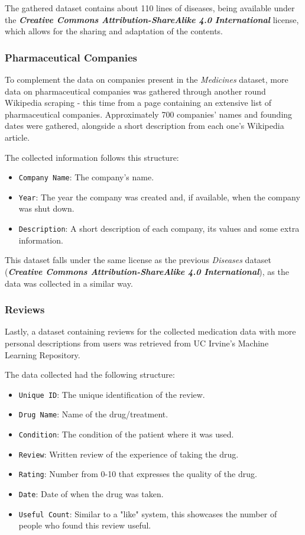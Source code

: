 \documentclass[sigconf]{acmart}
\begin{document}
The gathered dataset contains about 110 lines of diseases, being available under the \textit{\textbf{Creative Commons Attribution-ShareAlike 4.0 International}}\cite{wikipedia_cc} license, which allows for the sharing and adaptation of the contents.

\subsubsection{Pharmaceutical Companies}

To complement the data on companies present in the \textit{Medicines} dataset, more data on pharmaceutical companies was gathered through another round Wikipedia scraping - this time from a page containing an extensive list of pharmaceutical companies\cite{companies_dataset}. Approximately 700 companies' names and founding dates were gathered, alongside a short description from each one's Wikipedia article.

The collected information follows this structure:
\begin{itemize}
	\item {\texttt{Company Name}}: The company's name.
	\item {\texttt{Year}}: The year the company was created and, if available, when the company was shut down.
	\item {\texttt{Description}}: A short description of each company, its values and some extra information.
\end{itemize}

This dataset falls under the same license as the previous \textit{Diseases} dataset (\textit{\textbf{Creative Commons Attribution-ShareAlike 4.0 International}}), as the data was collected in a similar way.

\subsubsection{Reviews}

Lastly, a dataset containing reviews for the collected medication data with more personal descriptions from users\cite{reviews_dataset} was retrieved from UC Irvine's Machine Learning Repository\cite{irvine}.

The data collected had the following structure:
\begin{itemize}
	\item {\texttt{Unique ID}}: The unique identification of the review.
	\item {\texttt{Drug Name}}: Name of the drug/treatment.
	\item {\texttt{Condition}}: The condition of the patient where it was used.
	\item {\texttt{Review}}: Written review of the experience of taking the drug.
	\item {\texttt{Rating}}: Number from 0-10 that expresses the quality of the drug.
    \item {\texttt{Date}}: Date of when the drug was taken.
    \item {\texttt{Useful Count}}: Similar to a "like" system, this showcases the number of people who found this review useful.
\end{itemize}
\end{document}

